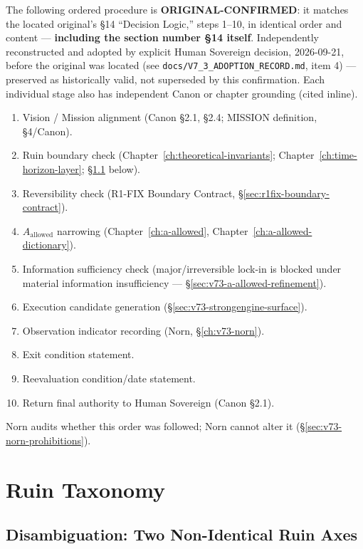 The following ordered procedure is \textbf{ORIGINAL-CONFIRMED}: it
matches the located original's \S14 ``Decision Logic,'' steps 1--10, in
identical order and content --- \textbf{including the section number
\S14 itself}. Independently reconstructed and adopted by explicit Human
Sovereign decision, 2026-09-21, before the original was located (see
\texttt{docs/V7\_3\_ADOPTION\_RECORD.md}, item 4) --- preserved as
historically valid, not superseded by this confirmation. Each
individual stage also has independent Canon or chapter grounding (cited
inline).

\begin{enumerate}
\item Vision / Mission alignment (Canon \S2.1, \S2.4; MISSION
definition, \S4/Canon).
\item Ruin boundary check (Chapter~\ref{ch:theoretical-invariants};
Chapter~\ref{ch:time-horizon-layer}; \S\ref{sec:v73-ruin-disambiguation}
below).
\item Reversibility check (R1-FIX Boundary Contract,
\S\ref{sec:r1fix-boundary-contract}).
\item $A_{\mathrm{allowed}}$ narrowing
(Chapter~\ref{ch:a-allowed}, Chapter~\ref{ch:a-allowed-dictionary}).
\item Information sufficiency check (major/irreversible lock-in is
blocked under material information insufficiency ---
\S\ref{sec:v73-a-allowed-refinement}).
\item Execution candidate generation
(\S\ref{sec:v73-strongengine-surface}).
\item Observation indicator recording (Norn,
\S\ref{ch:v73-norn}).
\item Exit condition statement.
\item Reevaluation condition/date statement.
\item Return final authority to Human Sovereign (Canon \S2.1).
\end{enumerate}

\noindent
Norn audits whether this order was followed; Norn cannot alter it
(\S\ref{sec:v73-norn-prohibitions}).

\chapter{Ruin Taxonomy}
\label{ch:v73-ruin-taxonomy}

\section{Disambiguation: Two Non-Identical Ruin Axes}
\label{sec:v73-ruin-disambiguation}

